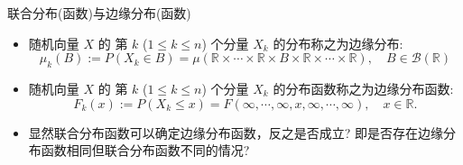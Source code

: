 \documentclass[Prob-All.tex]{subfiles}
\begin{document}






\begin{frame}{联合分布(函数)与边缘分布(函数)}
\begin{itemize}[<+-|alert@+>]
\item 随机向量 $X$ 的 第 $k$ ($1\leq k\leq n$) 个分量 $X_k$ 的分布称之为边缘分布:
\[
\mu_{k}(B):=P\left(X_{k} \in B\right)=\mu(\mathbb{R} \times \cdots \times \mathbb{R} \times B \times \mathbb{R} \times \cdots \times \mathbb{R}), \quad  B \in \mathcal{B}(\mathbb{R})
\]
\item 随机向量 $X$ 的 第 $k$ ($1\leq k\leq n$) 个分量 $X_k$ 的分布函数称之为边缘分布函数:
\[
F_{k}(x):=P\left(X_{k} \leqslant x\right)=F(\infty, \cdots, \infty, x, \infty, \cdots, \infty), \quad x \in \mathbb{R}.
\]
\item 显然联合分布函数可以确定边缘分布函数，反之是否成立? 即是否存在边缘分布函数相同但联合分布函数不同的情况?
\end{itemize}

\end{frame}
\end{document}
